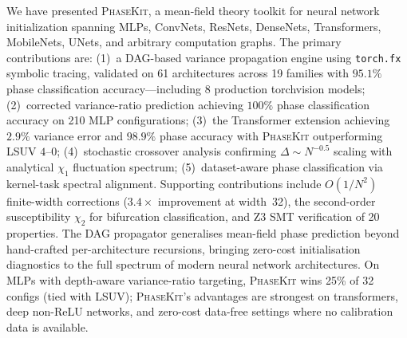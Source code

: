 \documentclass[10pt]{article}
\newcommand{\ToolName}{\textsc{PhaseKit}}
\begin{document}
We have presented \ToolName{}, a mean-field theory toolkit for neural network initialization spanning MLPs, ConvNets, ResNets, DenseNets, Transformers, MobileNets, UNets, and arbitrary computation graphs.
The primary contributions are: (1)~a DAG-based variance propagation engine using \texttt{torch.fx} symbolic tracing, validated on 61 architectures across 19 families with $95.1\%$ phase classification accuracy---including 8 production torchvision models; (2)~corrected variance-ratio prediction achieving $100\%$ phase classification accuracy on 210 MLP configurations; (3)~the Transformer extension achieving $2.9\%$ variance error and $98.9\%$ phase accuracy with \ToolName{} outperforming LSUV $4$--$0$; (4)~stochastic crossover analysis confirming $\Delta \sim N^{-0.5}$ scaling with analytical $\chi_1$ fluctuation spectrum; (5)~dataset-aware phase classification via kernel-task spectral alignment.
Supporting contributions include $O(1/N^2)$ finite-width corrections ($3.4\times$ improvement at width~32), the second-order susceptibility $\chi_2$ for bifurcation classification, and Z3 SMT verification of 20 properties.
The DAG propagator generalises mean-field phase prediction beyond hand-crafted per-architecture recursions, bringing zero-cost initialisation diagnostics to the full spectrum of modern neural network architectures.
On MLPs with depth-aware variance-ratio targeting, \ToolName{} wins 25\% of 32 configs (tied with LSUV); \ToolName{}'s advantages are strongest on transformers, deep non-ReLU networks, and zero-cost data-free settings where no calibration data is available.


\end{document}
